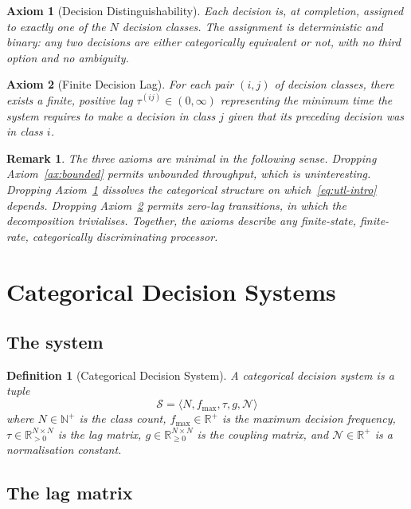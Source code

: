 \documentclass[twocolumn,11pt,a4paper]{article}
\newtheorem{definition}[theorem]{Definition}
\newtheorem{remark}[theorem]{Remark}
\newtheorem{axiom}{Axiom}
\newcommand{\Real}{\mathbb{R}}
\newcommand{\Natural}{\mathbb{N}}
\newcommand{\Norm}{\mathcal{N}}
\newcommand{\lag}{\tau}
\newcommand{\cpl}{g}
\newcommand{\Sys}{\mathcal{S}}
\newcommand{\classcount}{N}
\begin{document}
\begin{axiom}[Decision Distinguishability]
\label{ax:distinguishable}
Each decision is, at completion, assigned to exactly one of the $\classcount$ decision classes. The assignment is deterministic and binary: any two decisions are either categorically equivalent or not, with no third option and no ambiguity.
\end{axiom}

\begin{axiom}[Finite Decision Lag]
\label{ax:lag}
For each pair $(i, j)$ of decision classes, there exists a finite, positive lag $\lag^{(ij)} \in (0, \infty)$ representing the minimum time the system requires to make a decision in class $j$ given that its preceding decision was in class $i$.
\end{axiom}

\begin{remark}
The three axioms are minimal in the following sense. Dropping Axiom~\ref{ax:bounded} permits unbounded throughput, which is uninteresting. Dropping Axiom~\ref{ax:distinguishable} dissolves the categorical structure on which~\eqref{eq:utl-intro} depends. Dropping Axiom~\ref{ax:lag} permits zero-lag transitions, in which the decomposition trivialises. Together, the axioms describe any finite-state, finite-rate, categorically discriminating processor.
\end{remark}

\section{Categorical Decision Systems}
\label{sec:cds}

\subsection{The system}

\begin{definition}[Categorical Decision System]
\label{def:cds}
A \emph{categorical decision system} is a tuple
\[
\Sys = \langle \classcount, f_{\max}, \lag, \cpl, \Norm \rangle
\]
where $\classcount \in \Natural^+$ is the class count, $f_{\max} \in \Real^+$ is the maximum decision frequency, $\lag \in \Real^{\classcount \times \classcount}_{>0}$ is the lag matrix, $\cpl \in \Real^{\classcount \times \classcount}_{\geq 0}$ is the coupling matrix, and $\Norm \in \Real^+$ is a normalisation constant.
\end{definition}

\subsection{The lag matrix}
\end{document}
